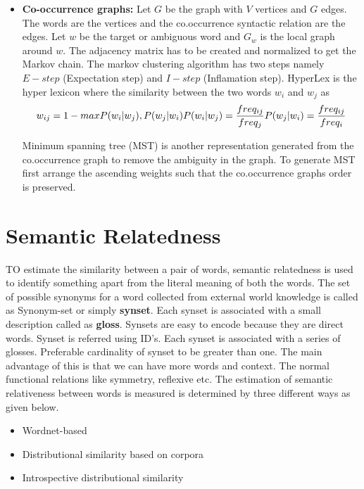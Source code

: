 \documentclass{bmcart}
\begin{document}
\begin{itemize}
\item {\bf Co-occurrence graphs:} Let $G$ be the graph with $V$ vertices and $G$ edges. The words are the vertices and the co.occurrence syntactic relation are the edges. Let $w$ be the target or ambiguous word and $G_w$  is the local graph around $w$. The adjacency matrix has to be created and normalized to get the Markov chain. The markov clustering algorithm has two steps namely $E-step$ (Expectation step) and $I-step$ (Inflamation step). HyperLex is the hyper lexicon where the similarity between the two words $w_i$ and $w_j$  as 
\begin{equation}
w_{ij} = 1 -max { P(w_i | w_j),P(w_j |w_i)} \\
P(w_i | w_j) = \frac{freq_{ij}}{freq_j} \\
P(w_j | w_i) = \frac{freq_{ij}}{freq_i}
\end{equation}

Minimum spanning tree (MST) is another representation generated from the co.occurrence graph to remove the ambiguity in the graph. To generate MST first arrange the ascending weights such that the co.occurrence graphs order is preserved. 
\end{itemize}

\section{Semantic Relatedness}
\label{sec:sr}

TO estimate the similarity between a pair of words, semantic relatedness is used to identify something apart from the literal meaning of both the words. The set of possible synonyms for a word collected from external world knowledge is called as Synonym-set or simply {\bf synset}. Each synset is associated with a small description called as {\bf gloss}. Synsets are easy to encode because they are direct words. Synset is referred using ID's. Each synset is associated with a series of glosses. Preferable cardinality of synset to be greater than one. The main advantage of this is that we can have more words and context. The normal functional relations like symmetry, reflexive etc. The estimation of semantic relativeness between words is measured is determined by three different ways as given below.
\begin{itemize}
\item 	Wordnet-based
\item Distributional similarity based on corpora
\item Introspective distributional similarity 
\end{itemize}
\end{document}
